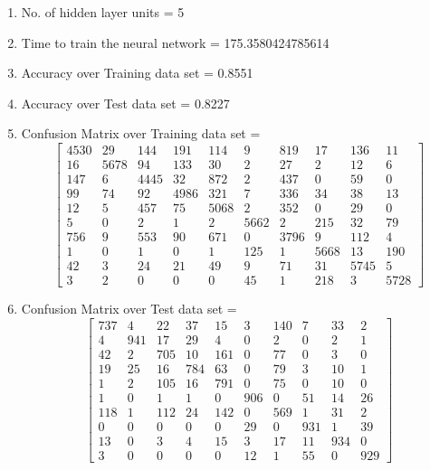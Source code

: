 \documentclass[11pt]{article}
\begin{document}
\begin{enumerate}
\item No. of hidden layer units = 5
\item Time to train the neural network = 175.3580424785614
\item Accuracy over Training data set = 0.8551
\item Accuracy over Test data set = 0.8227
\item Confusion Matrix over Training data set = 
\begin{equation}
  \begin{bmatrix}
 4530 &   29 &  144 &  191 &  114 &    9 &  819 &   17 &  136 &   11 \\
   16 & 5678 &   94 &  133 &   30 &    2 &   27 &    2 &   12 &    6 \\
  147 &    6 & 4445 &   32 &  872 &    2 &  437 &    0 &   59 &    0 \\
   99 &   74 &   92 & 4986 &  321 &    7 &  336 &   34 &   38 &   13 \\
   12 &    5 &  457 &   75 & 5068 &    2 &  352 &    0 &   29 &    0 \\
    5 &    0 &    2 &    1 &    2 & 5662 &    2 &  215 &   32 &   79 \\
  756 &    9 &  553 &   90 &  671 &    0 & 3796 &    9 &  112 &    4 \\
    1 &    0 &    1 &    0 &    1 &  125 &    1 & 5668 &   13 &  190 \\
   42 &    3 &   24 &   21 &   49 &    9 &   71 &   31 & 5745 &    5 \\
    3 &    2 &    0 &    0 &    0 &   45 &    1 &  218 &    3 & 5728 
  \end{bmatrix}
\end{equation}
\item Confusion Matrix over Test data set = 
\begin{equation}
  \begin{bmatrix}
737 & 4 & 22 & 37 & 15 & 3 & 140 & 7 & 33 & 2\\
4 & 941 & 17 & 29 & 4 & 0 & 2 & 0 & 2 & 1\\
42 & 2 & 705 & 10 & 161 & 0 & 77 & 0 & 3 & 0\\
19 & 25 & 16 & 784 & 63 & 0 & 79 & 3 & 10 & 1\\
1 & 2 & 105 & 16 & 791 & 0 & 75 & 0 & 10 & 0\\
1 & 0 & 1 & 1 & 0 & 906 & 0 & 51 & 14 & 26\\
118 & 1 & 112 & 24 & 142 & 0 & 569 & 1 & 31 & 2\\
0 & 0 & 0 & 0 & 0 & 29 & 0 & 931 & 1 & 39\\
13 & 0 & 3 & 4 & 15 & 3 & 17 & 11 & 934 & 0\\
3 & 0 & 0 & 0 & 0 & 12 & 1 & 55 & 0 & 929
  \end{bmatrix}
\end{equation}
\end{enumerate}
\end{document}
